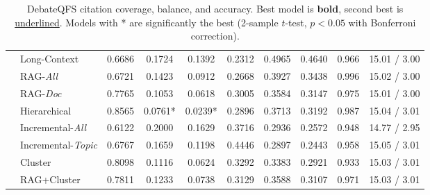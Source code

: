 \begin{table*}[!h]
\begin{tabular}{@{}clcccccccc@{}}
 & \multicolumn{1}{l|}{Long-Context} & 0.6686 & 0.1724 & \multicolumn{1}{c|}{0.1392} & 0.2312 & 0.4965 & \multicolumn{1}{c|}{0.4640} & 0.966 & 15.01 / 3.00 \\
 & \multicolumn{1}{l|}{RAG-\textit{All}} & 0.6721 & 0.1423 & \multicolumn{1}{c|}{0.0912} & 0.2668 & 0.3927 & \multicolumn{1}{c|}{0.3438} & 0.996 & 15.02 / 3.00 \\
 & \multicolumn{1}{l|}{RAG-\textit{Doc}} & 0.7765 & 0.1053 & \multicolumn{1}{c|}{0.0618} & 0.3005 & 0.3584 & \multicolumn{1}{c|}{0.3147} & 0.975 & 15.01 / 3.00 \\
 & \multicolumn{1}{l|}{Hierarchical} & 0.8565 & 0.0761* & \multicolumn{1}{c|}{0.0239*} & 0.2896 & 0.3713 & \multicolumn{1}{c|}{0.3192} & 0.987 & 15.04 / 3.01 \\
 & \multicolumn{1}{l|}{Incremental-\textit{All}} & 0.6122 & 0.2000 & \multicolumn{1}{c|}{0.1629} & 0.3716 & 0.2936 & \multicolumn{1}{c|}{0.2572} & 0.948 & 14.77 / 2.95 \\
 & \multicolumn{1}{l|}{Incremental-\textit{Topic}} & 0.6767 & 0.1659 & \multicolumn{1}{c|}{0.1198} & 0.4446 & 0.2897 & \multicolumn{1}{c|}{0.2443} & 0.958 & 15.05 / 3.01 \\
 & \multicolumn{1}{l|}{Cluster} & 0.8098 & 0.1116 & \multicolumn{1}{c|}{0.0624} & 0.3292 & 0.3383 & \multicolumn{1}{c|}{0.2921} & 0.933 & 15.03 / 3.01 \\
 & \multicolumn{1}{l|}{RAG+Cluster} & 0.7811 & 0.1233 & \multicolumn{1}{c|}{0.0738} & 0.3129 & 0.3588 & \multicolumn{1}{c|}{0.3107} & 0.971 & 15.03 / 3.01 \\ \bottomrule
\end{tabular}
\caption{\label{table:doc_cover_debate_all}DebateQFS citation coverage, balance, and accuracy. Best model is \textbf{bold}, second best is \underline{underlined}. Models with * are significantly the best (2-sample $t$-test, $p<0.05$ with Bonferroni correction).}
\end{table*}

